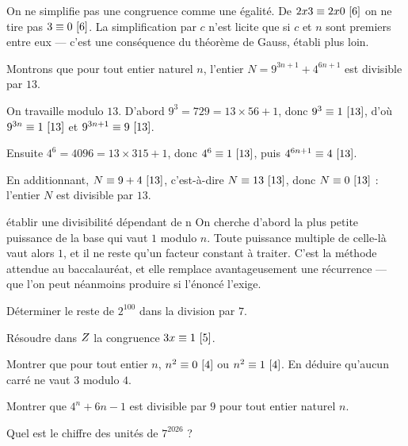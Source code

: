 \begin{avertissement}
On ne simplifie pas une congruence comme une égalité. De
$2x3 \equiv 2x0 \ [6]$ on ne tire pas $3 \equiv 0 \ [6]$. La
simplification par $c$ n'est licite que si $c$ et $n$ sont premiers entre eux
— c'est une conséquence du théorème de Gauss, établi plus loin.
\end{avertissement}

\begin{exemple}
Montrons que pour tout entier naturel $n$, l'entier
$N = 9^{3n+1}+4^{6n+1}$ est divisible par $13$.

On travaille modulo $13$. D'abord
$9^{3} = 729 = 13\times56+1$, donc $9^{3} \equiv 1 \ [13]$, d'où
$9^{3n} \equiv 1 \ [13]$ et $9^{3n+1} \equiv 9 \ [13]$.

Ensuite $4^{6} = 4096 = 13\times315+1$, donc $4^{6} \equiv 1 \ [13]$, puis
$4^{6n+1} \equiv 4 \ [13]$.

En additionnant, $N \equiv 9+4 \ [13]$, c'est-à-dire
$N \equiv 13 \ [13]$, donc $N \equiv 0 \ [13]$ : l'entier $N$ est divisible
par $13$.
\end{exemple}

\begin{methode}{établir une divisibilité dépendant de n}
On cherche d'abord la plus petite puissance de la base qui vaut $1$ modulo
$n$. Toute puissance multiple de celle-là vaut alors $1$, et il ne reste qu'un
facteur constant à traiter. C'est la méthode attendue au baccalauréat, et elle
remplace avantageusement une récurrence — que l'on peut néanmoins produire si
l'énoncé l'exige.
\end{methode}

\begin{entrainement}[congruences]
\exo[\niveau{1}] Déterminer le reste de $2^{100}$ dans la division par $7$.

\exo[\niveau{1}] Résoudre dans $Z$ la congruence $3x \equiv 1 \ [5]$.

\exo[\niveau{2}] Montrer que pour tout entier $n$, $n^{2} \equiv 0 \ [4]$ ou
$n^{2} \equiv 1 \ [4]$. En déduire qu'aucun carré ne vaut $3$ modulo $4$.

\exo[\niveau{2}] Montrer que $4^{n}+6n-1$ est divisible par $9$ pour tout
entier naturel $n$.

\exo[\niveau{3}] Quel est le chiffre des unités de $7^{2026}$ ?
\end{entrainement}

